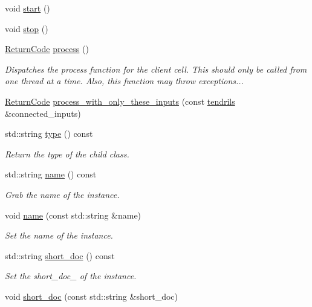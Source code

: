 \begin{DoxyCompactItemize}
void \hyperlink{structecto_1_1cell_a06abb010763ff7aeaaf2b28be4a6424a}{start} ()
\item 
void \hyperlink{structecto_1_1cell_abac52b774d350b02dc99a55c64b94bcd}{stop} ()
\item 
\hyperlink{namespaceecto_a93d82cd28db695d53963fb696582762c}{Return\-Code} \hyperlink{structecto_1_1cell_a6b810671ee21f5dddbc1206abfb999f3}{process} ()
\begin{DoxyCompactList}\small\item\em Dispatches the process function for the client cell. This should only be called from one thread at a time. Also, this function may throw exceptions... \end{DoxyCompactList}\item 
\hyperlink{namespaceecto_a93d82cd28db695d53963fb696582762c}{Return\-Code} \hyperlink{structecto_1_1cell_a407e320190ee98c1a1a3042ac3c38f0e}{process\-\_\-with\-\_\-only\-\_\-these\-\_\-inputs} (const \hyperlink{classecto_1_1tendrils}{tendrils} \&connected\-\_\-inputs)
\item 
std\-::string \hyperlink{structecto_1_1cell_ae3b84af61e78dab25f66a66773d5c5df}{type} () const 
\begin{DoxyCompactList}\small\item\em Return the type of the child class. \end{DoxyCompactList}\item 
std\-::string \hyperlink{structecto_1_1cell_a931fbc02fff66a58684ab25e00dbb2f8}{name} () const 
\begin{DoxyCompactList}\small\item\em Grab the name of the instance. \end{DoxyCompactList}\item 
void \hyperlink{structecto_1_1cell_a3956efb238f50a6983b86f430c47ca05}{name} (const std\-::string \&name)
\begin{DoxyCompactList}\small\item\em Set the name of the instance. \end{DoxyCompactList}\item 
std\-::string \hyperlink{structecto_1_1cell_aefa443962201caebb08d1a3163730639}{short\-\_\-doc} () const 
\begin{DoxyCompactList}\small\item\em Set the short\-\_\-doc\-\_\- of the instance. \end{DoxyCompactList}\item 
void \hyperlink{structecto_1_1cell_a49d510eec19d352c5729e6a2fd149340}{short\-\_\-doc} (const std\-::string \&short\-\_\-doc)

\end{DoxyCompactItemize}

